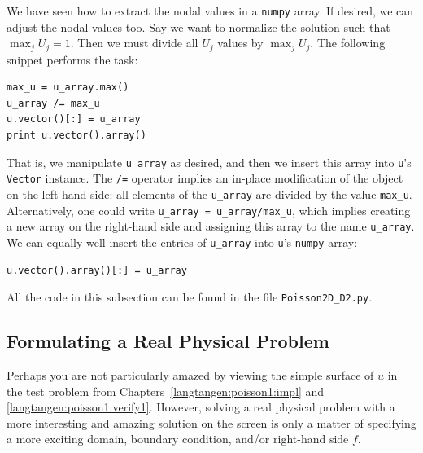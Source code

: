 We have seen how to extract the nodal values in a {\fontsize{12pt}{12pt}\texttt{numpy}} array.
If desired, we can adjust the nodal values too. Say we want to
normalize the solution such that $\max_j U_j = 1$. Then we
must divide all $U_j$ values
by $\max_j U_j$. The following snippet performs the task:
\begin{Verbatim}[fontsize=\fontsize{10pt}{10pt},tabsize=8,baselinestretch=1.05,
fontfamily=tt,xleftmargin=7mm]
max_u = u_array.max()
u_array /= max_u
u.vector()[:] = u_array
print u.vector().array()
\end{Verbatim}
\noindent
That is, we manipulate {\fontsize{12pt}{12pt}\verb!u_array!} as desired, and then
we insert this array into {\fontsize{12pt}{12pt}\texttt{u}}'s {\fontsize{12pt}{12pt}\texttt{Vector}} instance.
The {\fontsize{12pt}{12pt}\verb!/=!} operator implies an
in-place modification of the object on the left-hand side: all
elements of the {\fontsize{12pt}{12pt}\verb!u_array!} are divided by the value {\fontsize{12pt}{12pt}\verb!max_u!}.
Alternatively, one could write
{\fontsize{12pt}{12pt}\verb!u_array = u_array/max_u!}, which implies creating a new
array on the right-hand side and assigning this array to the
name {\fontsize{12pt}{12pt}\verb!u_array!}.
We can equally well insert the entries of {\fontsize{12pt}{12pt}\verb!u_array!} into
{\fontsize{12pt}{12pt}\texttt{u}}'s {\fontsize{12pt}{12pt}\texttt{numpy}} array:
\begin{Verbatim}[fontsize=\fontsize{10pt}{10pt},tabsize=8,baselinestretch=1.05,
fontfamily=tt,xleftmargin=7mm]
u.vector().array()[:] = u_array
\end{Verbatim}
\noindent
All the code in this subsection can be found in the file {\fontsize{12pt}{12pt}\verb!Poisson2D_D2.py!}.


\subsection{Formulating a Real Physical Problem}
\label{langtangen:poisson:membrane}

Perhaps you are not particularly
amazed by viewing the simple surface of $u$ in the
test problem from Chapters~\ref{langtangen:poisson1:impl}
and \ref{langtangen:poisson1:verify1}.
However, solving a real physical problem with a more interesting and amazing
solution on the screen
is only a matter
of specifying a more exciting domain, boundary condition, and/or
right-hand side $f$.

